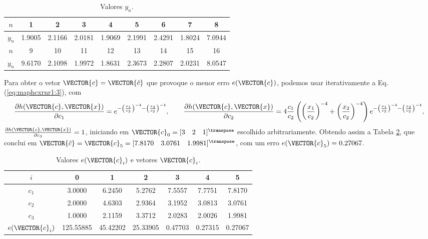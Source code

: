 \begin{table}[h!]
\centering
\begin{tabular}{|c|c|c|c|c|c|c|c|c|} 
 \hline
$n$   & 1 & 2 & 3 & 4 & 5 & 6 & 7 & 8\\ \hline
$y_n$ & 1.9005 & 2.1166 & 2.0181 & 1.9069 & 2.1991 & 2.4291 & 1.8024 & 7.0944  \\ \hline
 \hline
$n$   & 9 & 10 & 11 & 12 & 13 & 14 & 15 & 16\\  \hline
$y_n$ & 9.6170 & 2.1098 & 1.9972 & 1.8631 & 2.3673 & 2.2807 & 2.0231 & 8.0547 \\ \hline
\end{tabular}
\caption{Valores $y_n$.}
\label{table:theo:maphcxrnr1:zn}
\end{table}

\begin{SolutionT}\label{sol:theo:maphcxrnr1}
Para obter  o vetor $\VECTOR{c}=\VECTOR{\hat{c}}$
que provoque o menor erro $e(\VECTOR{c})$,
podemos usar iterativamente a Eq. (\ref{eq:maphcxrnr1:3}), com 
\begin{equation}
\frac{\partial h(\VECTOR{c},\VECTOR{x})}{\partial c_1} 
= e^{-\left(\frac{x_1}{c_2}\right)^{-4}-\left(\frac{x_2}{c_2}\right)^{-4}},\qquad 
\frac{\partial h(\VECTOR{c},\VECTOR{x})}{\partial c_2} 
= 4\frac{c_1}{c_2}\left(\left(\frac{x_1}{c_2}\right)^{-4}+\left(\frac{x_2}{c_2}\right)^{-4}\right)e^{-\left(\frac{x_1}{c_2}\right)^{-4}-\left(\frac{x_2}{c_2}\right)^{-4}}, 
\end{equation} 
$\frac{\partial h(\VECTOR{c},\VECTOR{x})}{\partial c_3} =1$,
iniciando em $\VECTOR{c}_{0}=[3\quad 2\quad 1]^{\transpose}$ escolhido arbitrariamente.
Obtendo assim a Tabela \ref{table:theo:maphcxrnr1:ei}, que conclui em
$\VECTOR{\hat{c}}=\VECTOR{c}_{5}=[7.8170\quad 3.0761\quad 1.9981]^{\transpose}$,
com  um erro $e(\VECTOR{c}_{5})=0.27067$.


\begin{table}[h!]
\centering
\begin{tabular}{|c|c|c|c|c|c|c|} 
 \hline
$i$   & 0 & 1 & 2 & 3 & 4 & 5 \\ \hline
\hline
$c_1$ & 3.0000 & 6.2450 & 5.2762 & 7.5557 & 7.7751 & 7.8170 \\ \hline
$c_2$ & 2.0000 & 4.6303 & 2.9364 & 3.1952 & 3.0813 & 3.0761 \\ \hline
$c_3$ & 1.0000 & 2.1159 & 3.3712 & 2.0283 & 2.0026 & 1.9981 \\ \hline
\hline
$e(\VECTOR{c}_{i})$ & 125.55885 & 45.42202 & 25.33905 & 0.47703 & 0.27315 & 0.27067  \\ \hline
\end{tabular}
\caption{Valores $e(\VECTOR{c}_{i})$ e vetores $\VECTOR{c}_{i}$.}
\label{table:theo:maphcxrnr1:ei}
\end{table}


\end{SolutionT}
